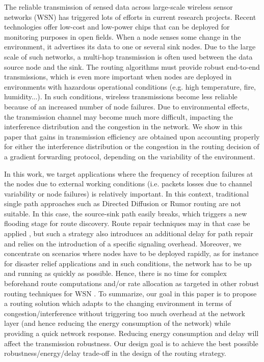 \documentclass[journal, peerreview, onecolumn, draftcls]{IEEEtran}
\begin{document}
The reliable transmission of sensed data across large-scale wireless sensor networks (WSN) has triggered lots of efforts in current research projects. Recent technologies offer low-cost and low-power chips that can be deployed for monitoring purposes in open fields. When a node senses some change in the environment, it advertises its data to one or several sink nodes. Due to the large scale of such networks, a multi-hop transmission is often used between the data source node and the sink. The routing algorithms must provide robust end-to-end transmissions, which is even more important when nodes are deployed in environments with hazardous operational conditions (e.g. high temperature, fire, humidity...). In such conditions, wireless transmissions become less reliable because of an increased number of node failures. Due to environmental effects, the transmission channel may become much more difficult, impacting the interference distribution and the congestion in the network. We show in this paper that gains in transmission efficiency are obtained upon accounting properly for either the interference distribution or the congestion in the routing decision of a gradient forwarding protocol, depending on the variability of the environment.

In this work, we target applications where the frequency of reception failures at the nodes due to external working conditions (i.e. packets losses due to channel variability or node failures) is relatively important. In this context, traditional single path approaches such as Directed Diffusion \cite{intanagonwiwat00} or Rumor routing \cite{braginsky02} are not suitable. In this case, the source-sink path easily breaks, which triggers a new flooding stage for route discovery. Route repair techniques may in that case be applied \cite{Tian03}, but such a strategy also introduces an additional delay for path repair and relies on the introduction of a specific signaling overhead.
Moreover, we concentrate on scenarios where nodes have to be deployed rapidly, as for instance for disaster relief applications and in such conditions, the network has to be up and running as quickly as possible. Hence, there is no time for complex beforehand route computations and/or rate allocation as targeted in other robust routing techniques for WSN \cite{Zhu08, Srinivasan03}.
To summarize, our goal in this paper is to propose a routing solution which adapts to the changing environment in terms of congestion/interference without triggering too much overhead at the network layer (and hence reducing the energy consumption of the network) while providing a quick network response. Reducing energy consumption and delay will affect the transmission robustness. Our design goal is to achieve the best possible robustness/energy/delay trade-off in the design of the routing strategy.
\end{document}
